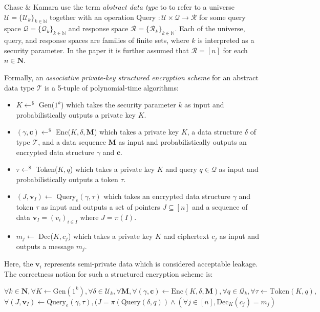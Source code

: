 \documentclass[11pt, pdftex]{article}
\begin{document}
Chase \& Kamara use the term {\em abstract data type} to to refer to a universe $\mathcal{U} = \{\mathcal{U}_k\}_{k \in \mathbb{N}}$ together with an operation Query $: \mathcal{U} \times \mathcal{Q} \to \mathcal{R}$ for some query space $\mathcal{Q} = \{\mathcal{Q}_k\}_{k \in \mathbb{N}}$ and response space $\mathcal{R} = \{\mathcal{R}_k\}_{k \in \mathbb{N}}$. Each of the universe, query, and response spaces are families of finite sets, where $k$ is interpreted as a security parameter. In the paper it is further assumed that $\mathcal{R} = [n]$ for each $n \in \mathbf{N}$.

Formally, an {\em associative private-key structured encryption scheme} for an abstract data type $\mathcal{T}$ is a 5-tuple of polynomial-time algorithms:
\begin{itemize}
	\item $K \gets^\$$ Gen($1^k$) which takes the security parameter $k$ as input and probabilistically outputs a private key $K$.
	\item $(\gamma, \mathbf{c}) \gets^\$$ Enc($K,\delta,\mathbf{M}$) which takes a private key $K$, a data structure $\delta$ of type $\mathcal{T}$, and a data sequence $\mathbf{M}$ as input and probabilistically outputs an encrypted data structure $\gamma$ and $\mathbf{c}$.
	\item $\tau \gets^\$$ Token($K,q$) which takes a private key $K$ and query $q \in \mathcal{Q}$ as input and probabilistically outputs a token $\tau$.
	\item $(J,\mathbf{v}_I) \gets$ $\mathrm{Query}_e(\gamma,\tau)$ which takes an encrypted data structure $\gamma$ and token $\tau$ as input and outputs a set of pointers $J \subseteq [n]$ and a sequence of data $\mathbf{v}_I = (v_i)_{i \in I}$ where $J = \pi(I)$.
	\item $m_j \gets$ Dec($K,c_j$) which takes a private key $K$ and ciphertext $c_j$ as input and outputs a message $m_j$.
\end{itemize}

Here, the $\mathbf{v}_i$ represents semi-private data which is considered acceptable leakage. The correctness notion for such a structured encryption scheme is:

$$\forall k \in \mathbf{N}, \forall K \gets \mathrm{Gen}(1^k), \forall \delta \in \mathcal{U}_k, \forall \mathbf{M}, \forall (\gamma, \mathbf{c}) \gets \mathrm{Enc}(K,\delta,\mathbf{M}), \forall q \in \mathcal{Q}_k, \forall \tau \gets \mathrm{Token}(K,q),$$
$$\forall (J, \mathbf{v}_I) \gets \mathrm{Query}_e(\gamma,\tau), (J = \pi(\mathrm{Query}(\delta,q)) \land (\forall j \in [n], \mathrm{Dec}_K(c_j) = m_j)$$
\end{document}
